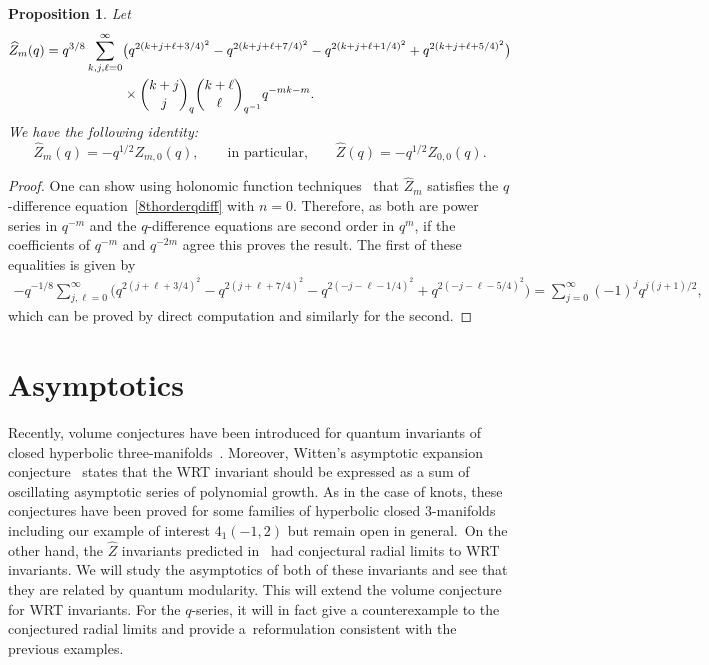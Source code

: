 \documentclass[pdftex]{sigma}
\numberwithin{equation}{section}
\newtheorem{Proposition}[Theorem]{Proposition}
 { \theoremstyle{definition}
\newtheorem{Definition}[Theorem]{Definition}
\newtheorem{Note}[Theorem]{Note}
\newtheorem{Example}[Theorem]{Example}
\newtheorem{Remark}[Theorem]{Remark} }
\begin{document}
\begin{Proposition}\label{prop:zhat}
Let
\begin{align*}
 \widehat{Z}_{m}(q)&{}=q^{3/8}\sum_{k,j,\ell=0}^{\infty}\bigl(q^{2(k+j+\ell+3/4)^2}-q^{2(k+j+\ell+7/4)^2}-q^{2(k+j+\ell+1/4)^2}+q^{2(k+j+\ell+5/4)^2}\bigr)\\
 &\hphantom{=q^{3/8}\sum_{k,j,\ell=0}^{\infty}}{}\ \times\binom{k+j}{j}_q\binom{k+\ell}{\ell}_{q^{-1}}q^{-mk-m} .
\end{align*}
We have the following identity:
\[
 \widehat{Z}_{m}(q) =-q^{1/2}Z_{m,0}(q) ,\qquad \text{in particular,} \qquad
 \widehat{Z}(q) =-q^{1/2}Z_{0,0}(q) .
\]
\end{Proposition}
\begin{proof}
One can show using holonomic function techniques~\cite{WilfZeil} that $\widehat{Z}_{m}$ satisfies the $q$-difference equation~\eqref{8thorderqdiff} with $n=0$. Therefore, as both are power series in $q^{-m}$ and the $q$-difference equations are second order in $q^{m}$, if the coefficients of $q^{-m}$ and $q^{-2m}$ agree this proves the result. The first of these equalities is given by
\begin{gather*}
 -q^{-1/8}\!\sum_{j,\ell=0}^{\infty}\!\bigl(q^{2(j+\ell+3/4)^2}\!-q^{2(j+\ell+7/4)^2}\!-q^{2(-j-\ell-1/4)^2}\!+q^{2(-j-\ell-5/4)^2}\bigr)
 \! =\!\sum_{j=0}^{\infty}(-1)^jq^{j(j+1)/2} ,
\end{gather*}
which can be proved by direct computation and similarly for the second.
\end{proof}

\section{Asymptotics}

Recently, volume conjectures have been introduced for quantum invariants of closed hyperbolic three-manifolds~\cite{ChenYang}. Moreover, Witten's asymptotic expansion conjecture~\cite{Witten} states that the WRT invariant should be expressed as a sum of oscillating asymptotic series of polynomial growth. As in the case of knots, these conjectures have been proved for some families of hyperbolic closed $3$-manifolds~\cite{CharlesMarche,Ohtsuki:VCYVC} including our example of interest $4_1(-1,2)$ but remain open in general.~On the other hand, the $\widehat{Z}$ invariants predicted in~\cite{GukovMan,GPV} had conjectural radial limits to WRT invariants. We will study the asymptotics of both of these invariants and see that they are related by quantum modularity. This will extend the volume conjecture for WRT invariants. For the $q$-series, it will in fact give a counterexample to the conjectured radial limits and provide a~reformulation consistent with the previous examples.
\end{document}
